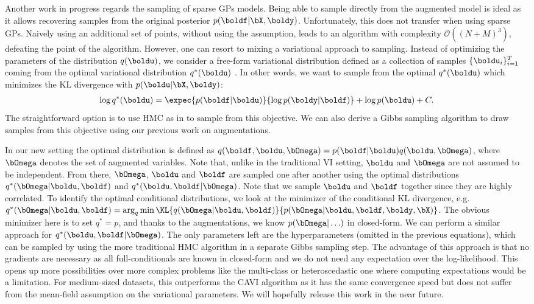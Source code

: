 Another work in progress regards the sampling of sparse \ac{GPs} models.
Being able to sample directly from the augmented model is ideal as it allows recovering samples from the original posterior $p(\boldf|\bX,\boldy)$.
Unfortunately, this does not transfer when using sparse \ac{GPs}.
Naively using an additional set of points, without using the \citet{Titsias2009} assumption, leads to an algorithm with complexity $\mathcal{O}((N+M)^3)$, defeating the point of the algorithm.
However, one can resort to mixing a variational approach to sampling.
Instead of optimizing the parameters of the distribution $q(\boldu)$, we consider a free-form variational distribution defined as a collection of samples $\{\boldu_i\}_{i=1}^T$ coming from the optimal variational distribution $q^*(\boldu)$ \cite{hensmanMCMCVariationallySparse2015}.
In other words, we want to sample from the optimal $q^*(\boldu)$ which minimizes the \ac{KL} divergence with $p(\boldu|\bX,\boldy)$:
\begin{align*}
    \log q^*(\boldu) = \expec{p(\boldf|\boldu)}{\log p(\boldy|\boldf)} + \log p(\boldu) + C.
\end{align*}
The straightforward option is to use \ac{HMC} as in \cite{hensmanMCMCVariationallySparse2015} to sample from this objective.
We can also derive a Gibbs sampling algorithm to draw samples from this objective using our previous work on augmentations.

In our new setting the optimal distribution is defined as $q(\boldf,\boldu,\bOmega) = p(\boldf|\boldu)q(\boldu, \bOmega)$, where $\bOmega$ denotes the set of augmented variables.
Note that, unlike in the traditional \ac{VI} setting, $\boldu$ and $\bOmega$ are not assumed to be independent.
From there, $\bOmega$, $\boldu$ and $\boldf$ are sampled one after another using the optimal distributions $q^*(\bOmega|\boldu,\boldf)$ and $q^*(\boldu,\boldf|\bOmega)$.
Note that we sample $\boldu$ and $\boldf$ together since they are highly correlated.
To identify the optimal conditional distributions, we look at the minimizer of the conditional \ac{KL} divergence, e.g. $q^*(\bOmega|\boldu,\boldf) = \arg_{q} \min \KL{q(\bOmega|\boldu,\boldf)}{p(\bOmega|\boldu,\boldf,\boldy,\bX)}$.
The obvious minimizer here is to set $q^*=p$, and thanks to the augmentations, we know $p(\bOmega|\ldots)$ in closed-form.
We can perform a similar approach for $q^*(\boldu,\boldf|\bOmega)$.
The only parameters left are the hyperparameters (omitted in the previous equations), which can be sampled by using the more traditional \ac{HMC} algorithm in a separate Gibbs sampling step.
The advantage of this approach is that no gradients are necessary as all full-conditionals are known in closed-form and we do not need any expectation over the log-likelihood.
This opens up more possibilities over more complex problems like the multi-class or heteroscedastic one where computing expectations would be a limitation.
For medium-sized datasets, this outperforms the \ac{CAVI} algorithm as it has the same convergence speed but does not suffer from the mean-field assumption on the variational parameters.
We will hopefully release this work in the near future.

